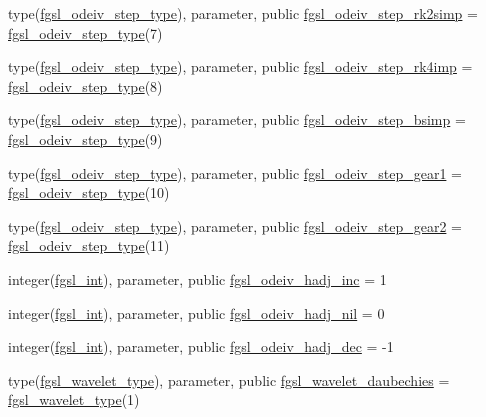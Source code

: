 \begin{DoxyCompactItemize}
\item 
type(\hyperlink{structfgsl_1_1fgsl__odeiv__step__type}{fgsl\+\_\+odeiv\+\_\+step\+\_\+type}), parameter, public \hyperlink{namespacefgsl_aba1fcb32d594f9bfa4e3d81e79ea8bff}{fgsl\+\_\+odeiv\+\_\+step\+\_\+rk2simp} = \hyperlink{structfgsl_1_1fgsl__odeiv__step__type}{fgsl\+\_\+odeiv\+\_\+step\+\_\+type}(7)
\item 
type(\hyperlink{structfgsl_1_1fgsl__odeiv__step__type}{fgsl\+\_\+odeiv\+\_\+step\+\_\+type}), parameter, public \hyperlink{namespacefgsl_ac3387d8df1b6ef380e912fcb3a852d2b}{fgsl\+\_\+odeiv\+\_\+step\+\_\+rk4imp} = \hyperlink{structfgsl_1_1fgsl__odeiv__step__type}{fgsl\+\_\+odeiv\+\_\+step\+\_\+type}(8)
\item 
type(\hyperlink{structfgsl_1_1fgsl__odeiv__step__type}{fgsl\+\_\+odeiv\+\_\+step\+\_\+type}), parameter, public \hyperlink{namespacefgsl_a64196b17cea8ee47b1386de3b5c3186e}{fgsl\+\_\+odeiv\+\_\+step\+\_\+bsimp} = \hyperlink{structfgsl_1_1fgsl__odeiv__step__type}{fgsl\+\_\+odeiv\+\_\+step\+\_\+type}(9)
\item 
type(\hyperlink{structfgsl_1_1fgsl__odeiv__step__type}{fgsl\+\_\+odeiv\+\_\+step\+\_\+type}), parameter, public \hyperlink{namespacefgsl_adc37c503cd35373720d2238db569e06a}{fgsl\+\_\+odeiv\+\_\+step\+\_\+gear1} = \hyperlink{structfgsl_1_1fgsl__odeiv__step__type}{fgsl\+\_\+odeiv\+\_\+step\+\_\+type}(10)
\item 
type(\hyperlink{structfgsl_1_1fgsl__odeiv__step__type}{fgsl\+\_\+odeiv\+\_\+step\+\_\+type}), parameter, public \hyperlink{namespacefgsl_ac5f41836ce32fc0099426b20ac83966c}{fgsl\+\_\+odeiv\+\_\+step\+\_\+gear2} = \hyperlink{structfgsl_1_1fgsl__odeiv__step__type}{fgsl\+\_\+odeiv\+\_\+step\+\_\+type}(11)
\item 
integer(\hyperlink{namespacefgsl_a222deda1d7a0c0e845ce4a683318efeb}{fgsl\+\_\+int}), parameter, public \hyperlink{namespacefgsl_a6af547b616e922df4bf6658c0199307d}{fgsl\+\_\+odeiv\+\_\+hadj\+\_\+inc} = 1
\item 
integer(\hyperlink{namespacefgsl_a222deda1d7a0c0e845ce4a683318efeb}{fgsl\+\_\+int}), parameter, public \hyperlink{namespacefgsl_ac1c1bce27a4a8cb6ac049b401b496372}{fgsl\+\_\+odeiv\+\_\+hadj\+\_\+nil} = 0
\item 
integer(\hyperlink{namespacefgsl_a222deda1d7a0c0e845ce4a683318efeb}{fgsl\+\_\+int}), parameter, public \hyperlink{namespacefgsl_a2325b2b4a96fc162d6be916e21d71bb0}{fgsl\+\_\+odeiv\+\_\+hadj\+\_\+dec} = -\/1
\item 
type(\hyperlink{structfgsl_1_1fgsl__wavelet__type}{fgsl\+\_\+wavelet\+\_\+type}), parameter, public \hyperlink{namespacefgsl_a67c3173fcd7991624114d64eb31bf6d8}{fgsl\+\_\+wavelet\+\_\+daubechies} = \hyperlink{structfgsl_1_1fgsl__wavelet__type}{fgsl\+\_\+wavelet\+\_\+type}(1)

\end{DoxyCompactItemize}
